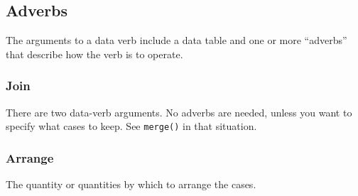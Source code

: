 \documentclass[]{article}
\newenvironment{Shaded}{\begin{snugshade}}{\end{snugshade}}
\newcommand{\KeywordTok}[1]{\textcolor[rgb]{0.13,0.29,0.53}{\textbf{{#1}}}}
\newcommand{\StringTok}[1]{\textcolor[rgb]{0.31,0.60,0.02}{{#1}}}
\newcommand{\CommentTok}[1]{\textcolor[rgb]{0.56,0.35,0.01}{\textit{{#1}}}}
\newcommand{\NormalTok}[1]{{#1}}
\begin{document}
\subsection{Adverbs}\label{adverbs}

The arguments to a data verb include a data table and one or more
``adverbs'' that describe how the verb is to operate.

\subsubsection{Join}\label{join}

There are two data-verb arguments. No adverbs are needed, unless you
want to specify what cases to keep. See \texttt{merge()} in that
situation.

\subsubsection{Arrange}\label{arrange}

The quantity or quantities by which to arrange the cases.

\begin{Shaded}
\end{Shaded}
\end{document}
